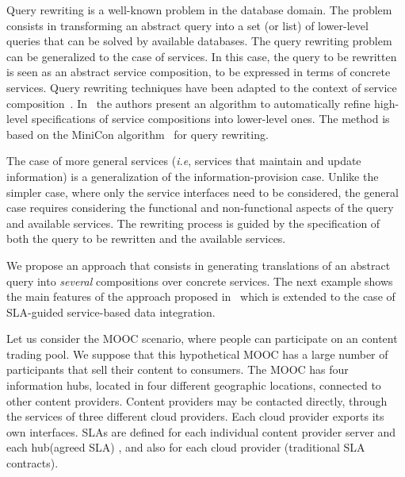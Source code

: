 \color{black}
Query rewriting is a well-known problem in the database domain.
The problem consists in transforming an abstract query into a set (or list) of lower-level queries that can be solved by  available databases.
The query rewriting problem can be generalized to the case of services.
In this case, the query to be rewritten is seen as an abstract service composition, to be expressed in terms of concrete services.
Query rewriting techniques have been adapted to the context of service composition~\cite{BBM10,ZLC11,CostaAMR13}. 
In~\cite{CostaAMR13} the authors present an algorithm to automatically refine high-level specifications of service compositions into lower-level ones. 
The method is based on the MiniCon algorithm~\cite{PH01} for query rewriting.

The case of more general services (\textit{i.e}, services that maintain and update information) is a generalization of the information-provision case.
Unlike the simpler case, where only the service interfaces need to be considered, the general case requires considering the functional and non-functional aspects of the query and available services.
The rewriting process is guided by the specification of both the query to be rewritten and the available services.


We propose an approach that consists in generating translations of an abstract query into \textit{several}  compositions over concrete  services. 
The next example shows the main features of the approach proposed in~\cite{CostaAMR13} which is extended to the case of SLA-guided service-based data integration. 

Let us consider the MOOC scenario, where people can participate on an content trading pool.
We suppose that this hypothetical MOOC has a large number of participants that sell their content  to  consumers. 
The MOOC has four information hubs, located in four different geographic locations, connected to other content providers.
Content providers may be  contacted directly, through the services of three different cloud providers.
Each cloud provider exports its own interfaces.
SLAs are defined for each individual content provider server and  each hub(agreed SLA)  , and also for each cloud provider (traditional SLA contracts). 

